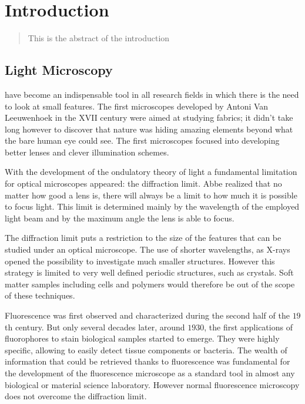 \chapter{Introduction}
\label{chapter_1}

\begin{abstract}
This is the abstract of the introduction
\end{abstract}

\newpage

\section{Light Microscopy}
 have become an indispensable tool in all research fields
in which there is the need to look at small features. The first microscopes
developed by Antoni Van Leeuwenhoek in the XVII century were aimed at studying
fabrics; it didn't take long however to discover that nature was hiding amazing
elements beyond what the bare human eye could see. The first microscopes focused
into developing better lenses and clever illumination schemes. 

With the development of the ondulatory theory of light a fundamental limitation
for optical microscopes appeared: the diffraction limit. Abbe realized that no
matter how good a lens is, there will always be a limit to how much it is
possible to focus light. This limit is determined mainly by the wavelength of
the employed light beam and by the maximum angle the lens is able to focus. 

The diffraction limit puts a restriction to the size of the features that can be
studied under an optical microscope. The use of shorter wavelengths, as
X-rays\cite{von1915concerning} opened the possibility to investigate much
smaller structures. However this strategy is limited to very well defined
periodic structures, such as crystals. Soft matter samples including cells and
polymers would therefore be out of the scope of these techniques.

Fluorescence was first observed and characterized during the second half of the
$19$th century. But only several decades later, around $1930$, the first
applications of fluorophores to stain biological samples started to emerge. They
were highly specific, allowing to easily detect tissue components or bacteria.
The wealth of information that could be retrieved thanks to fluorescence was
fundamental for the development of the fluorescence microscope as a standard
tool in almost any biological or material science laboratory. However normal
fluorescence microscopy does not overcome the diffraction limit.

